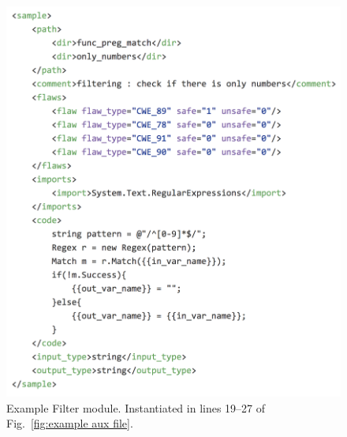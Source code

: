 \begin{figure}[tbp]
  \includegraphics[width=\linewidth]{fig_Filter_file.png}
  \caption{Example Filter module. Instantiated in lines 19--27 of
           Fig.~\ref{fig:example aux file}.}
  \label{fig:example filter file}
\end{figure}

